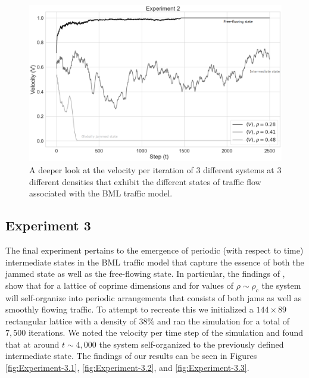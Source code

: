 \begin{figure}[H]
    \centering
    \includegraphics[width=\linewidth]{Images/Section 4/Experiment 2/2.4.pdf}
    \caption{A deeper look at the velocity per iteration of 3 different systems at 3 different densities that exhibit the different states of traffic flow associated with the BML traffic model.}
    \label{fig:Experiment-2.4}
\end{figure}

\subsection{Experiment 3}
\label{subsec:Results-and-Discussion:Experiment-3}
The final experiment pertains to the emergence of periodic (with respect to time) intermediate states in the BML traffic model that capture the essence of both the jammed state as well as the free-flowing state. In particular, the findings of \citeauthor{DSouza}, show that for a lattice of coprime dimensions and for values of $\rho \sim \rho_c$ the system will self-organize into periodic arrangements that consists of both jams as well as smoothly flowing traffic. To attempt to recreate this we initialized a $144 \times 89$ rectangular lattice with a density of $38\%$ and ran the simulation for a total of $7,500$ iterations. We noted the velocity per time step of the simulation and found that at around $t \sim 4,000$ the system self-organized to the previously defined intermediate state. The findings of our results can be seen in Figures \ref{fig:Experiment-3.1}, \ref{fig:Experiment-3.2}, and \ref{fig:Experiment-3.3}.


